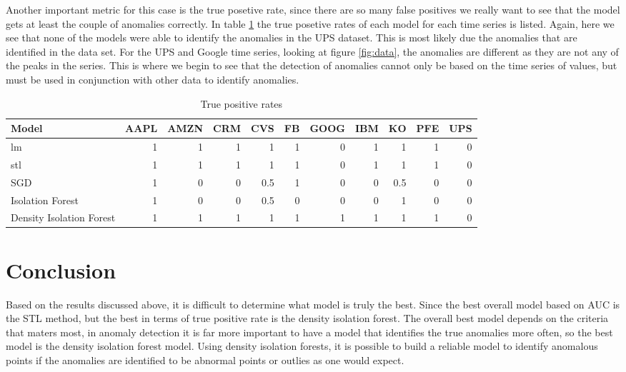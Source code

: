 \documentclass{article}
\begin{document}
Another important metric for this case is the true posetive rate, since there are so many false positives we really want to see that the model gets at least the couple of anomalies correctly. In table \ref{tab:tp_rates} the true posetive rates of each model for each time series is listed. Again, here we see that none of the models were able to identify the anomalies in the UPS dataset. This is most likely due the anomalies that are identified in the data set. For the UPS and Google time series, looking at figure \ref{fig:data}, the anomalies are different as they are not any of the peaks in the series. This is where we begin to see that the detection of anomalies cannot only be based on the time series of values, but must be used in conjunction with other data to identify anomalies. 

\begin{table}[ht]
    \caption{True positive rates}
    \label{tab:tp_rates}
    \centering
    \small
    \begin{tabular}{l|r|r|r|r|r|r|r|r|r|r}
        \hline
        Model & AAPL & AMZN & CRM & CVS & FB & GOOG & IBM & KO & PFE & UPS\\
        \hline
        lm & 1 & 1 & 1 & 1 & 1 & 0 & 1 & 1 & 1 & 0\\
        \hline
        stl & 1 & 1 & 1 & 1 & 1 & 0 & 1 & 1 & 1 & 0\\
        \hline
        SGD & 1 & 0 & 0 & 0.5 & 1 & 0 & 0 & 0.5 & 0 & 0\\
        \hline
        Isolation Forest & 1 & 0 & 0 & 0.5 & 0 & 0 & 0 & 1 & 0 & 0\\
        \hline
        Density Isolation Forest & 1 & 1 & 1 & 1 & 1 & 1 & 1 & 1 & 1 & 0\\
        \hline
    \end{tabular}
\end{table}

\section{Conclusion}
Based on the results discussed above, it is difficult to determine what model is truly the best. Since the best overall model based on AUC is the STL method, but the best in terms of true positive rate is the density isolation forest. The overall best model depends on the criteria that maters most, in anomaly detection it is far more important to have a model that identifies the true anomalies more often, so the best model is the density isolation forest model. Using density isolation forests, it is possible to build a reliable model to identify anomalous points if the anomalies are identified to be abnormal points or outlies as one would expect. 
\end{document}
